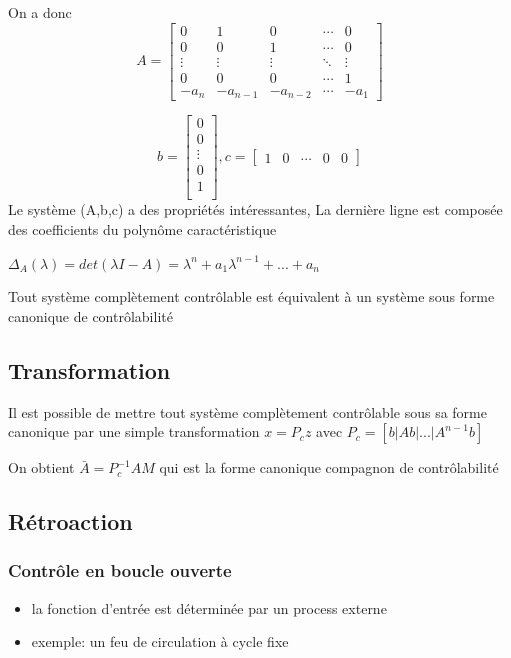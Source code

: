 \documentclass[resume]{subfiles}
\begin{document}
On a donc 
$$
A=\begin{bmatrix}
0 & 1 & 0 & \cdots & 0 \\
0 & 0 & 1 & \cdots & 0 \\
\vdots & \vdots & \vdots& \ddots & \vdots\\
0 & 0 & 0 & \cdots & 1 \\
-a_n & -a_{n-1}& -a_{n-2} &\cdots& -a_{1}
\end{bmatrix}$$

$$b=\begin{bmatrix}
0 \\
0 \\
\vdots\\
0 \\
1 \\
\end{bmatrix},
c=\begin{bmatrix}
1&0&\cdots&0 &0
\end{bmatrix}
$$
Le système (A,b,c) a des propriétés intéressantes, La dernière ligne est composée des coefficients du polynôme caractéristique

$\Delta_A(\lambda) = det (\lambda I - A) = \lambda^n + a_1\lambda^{n-1} +...+ a_n  $ 

Tout système complètement contrôlable est équivalent à un système sous forme canonique de contrôlabilité

\subsection{Transformation}

Il est possible de mettre tout système complètement contrôlable sous sa forme canonique par une simple transformation $x=P_cz$ avec $P_c=[b|Ab|...|A^{n-1}b]$ 

On obtient $\bar{A}= P_c^{-1}AM$ qui est la forme canonique compagnon de contrôlabilité

\subsection{Rétroaction}

\subsubsection{Contrôle en boucle ouverte}
\begin{itemize}
\item la fonction d'entrée est déterminée par un process
  externe
\item exemple: un feu de circulation à cycle fixe
\end{itemize}
\end{document}
